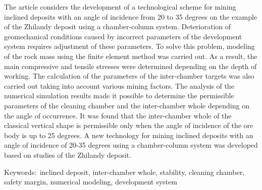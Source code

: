 The article considers the development of a technological scheme for
mining inclined deposits with an angle of incidence from 20 to 35
degrees on the example of the Zhilandy deposit using a chamber-column
system. Deterioration of geomechanical conditions caused by incorrect
parameters of the development system requires adjustment of these
parameters. To solve this problem, modeling of the rock mass using the
finite element method was carried out. As a result, the main compressive
and tensile stresses were determined depending on the depth of working.
The calculation of the parameters of the inter-chamber targets was also
carried out taking into account various mining factors. The analysis of
the numerical simulation results made it possible to determine the
permissible parameters of the cleaning chamber and the inter-chamber
whole depending on the angle of occurrence. It was found that the
inter-chamber whole of the classical vertical shape is permissible only
when the angle of incidence of the ore body is up to 25 degrees. A new
technology for mining inclined deposits with an angle of incidence of
20-35 degrees using a chamber-column system was developed based on
studies of the Zhilandy deposit.

Keywords:~inclined deposit, inter-chamber whole, stability, cleaning
chamber, safety margin, numerical modeling, development system

